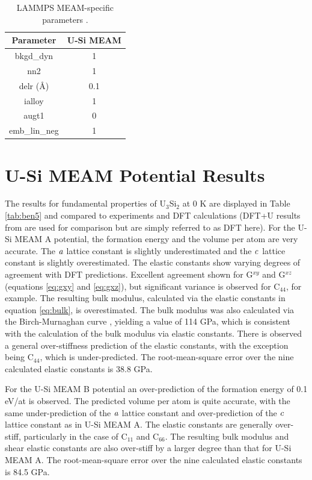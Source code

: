 \documentclass[review]{elsarticle}
\begin{document}
\begin{table}[h!]
\caption{LAMMPS MEAM-specific parameters \cite{plimpton1995}.}\label{tab:ben4}
\begin{center}
\begin{tabular}{|c|c|}
     \hline
     Parameter & U-Si MEAM  \\
     \hline
     bkgd\_dyn & 1 \\
     nn2 & 1 \\
     delr (\AA)& 0.1 \\
     ialloy & 1 \\
     augt1 & 0 \\
     emb\_lin\_neg & 1 \\
     \hline
\end{tabular}
\end{center}
\label{default}
\end{table}%

\clearpage

\section{U-Si MEAM Potential Results}

The results for fundamental properties of U$_{3}$Si$_{2}$ at 0 K are displayed in Table \ref{tab:ben5} and compared to experiments \cite{zachariasen1949, berche2009} and DFT calculations \cite{noordhoek2016} (DFT+U results from \cite{noordhoek2016} are used for comparison but are simply referred to as DFT here).  For the U-Si MEAM A potential, the formation energy and the volume per atom are very accurate.  The $\it{a}$ lattice constant is slightly underestimated and the $\it{c}$ lattice constant is slightly overestimated.  The elastic constants show varying degrees of agreement with DFT predictions.  Excellent agreement shown for G$^{xy}$ and G$^{xz}$ (equations \ref{eq:gxy} and \ref{eq:gxz}), but significant variance is observed for C$_{44}$, for example.  The resulting bulk modulus, calculated via the elastic constants in equation \ref{eq:bulk}, is overestimated.  The bulk modulus was also calculated via the Birch-Murnaghan curve \cite{cohen85, birch47}, yielding a value of 114 GPa, which is consistent with the calculation of the bulk modulus via elastic constants.  There is observed a general over-stiffness prediction of the elastic constants, with the exception being C$_{44}$, which is under-predicted.  The root-mean-square error over the nine calculated elastic constants is 38.8 GPa.  

For the U-Si MEAM B potential an over-prediction of the formation energy of 0.1 eV/at is observed.  The predicted volume per atom is quite accurate, with the same under-prediction of the $\it{a}$ lattice constant and over-prediction of the $\it{c}$ lattice constant as in U-Si MEAM A.  The elastic constants are generally over-stiff, particularly in the case of C$_{11}$ and C$_{66}$.  The resulting bulk modulus and shear elastic constants are also over-stiff by a larger degree than that for U-Si MEAM A.  The root-mean-square error over the nine calculated elastic constants is 84.5 GPa.
\end{document}
